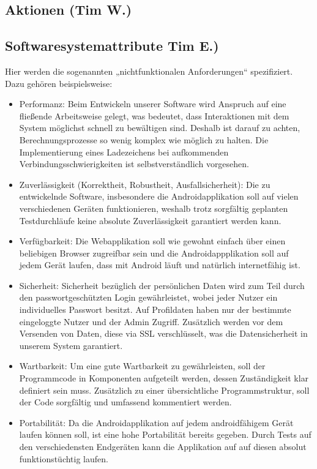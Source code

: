 \documentclass[fontsize=12pt,paper=a4,twoside]{scrartcl}
\begin{document}
\subsection{Aktionen (Tim W.)}
  



\subsection{Softwaresystemattribute Tim E.)}
\label{sec:softwaresystemattribute}

  Hier werden die sogenannten „nichtfunktionalen Anforderungen“ spezifiziert. Dazu gehören beispielsweise: 
\begin{itemize}
	\item Performanz: Beim Entwickeln unserer Software wird Anspruch auf eine fließende Arbeitsweise gelegt, was bedeutet, dass Interaktionen mit dem System möglichst schnell zu bewältigen sind. Deshalb ist darauf zu achten, Berechnungsprozesse so wenig komplex wie möglich zu halten. Die Implementierung eines Ladezeichens bei aufkommenden Verbindungsschwierigkeiten ist selbstverständlich vorgesehen.
	
	\item Zuverlässigkeit (Korrektheit, Robustheit, Ausfallsicherheit): Die zu entwickelnde Software, insbesondere die Androidapplikation soll auf vielen verschiedenen Geräten funktionieren, weshalb trotz sorgfältig geplanten Testdurchläufe keine absolute Zuverlässigkeit garantiert werden kann. 
	
	\item Verfügbarkeit: Die Webapplikation soll wie gewohnt einfach über einen beliebigen Browser zugreifbar sein und die Androidappplikation soll auf jedem Gerät laufen, dass mit Android läuft und natürlich internetfähig ist. 
	
	\item Sicherheit: Sicherheit bezüglich der persönlichen Daten wird zum Teil durch den passwortgeschützten Login gewährleistet, wobei jeder Nutzer ein individuelles Passwort besitzt. Auf Profildaten haben nur der bestimmte eingeloggte Nutzer und der Admin Zugriff. Zusätzlich werden vor dem Versenden von Daten, diese via SSL verschlüsselt, was die Datensicherheit in unserem System garantiert.
	
	\item Wartbarkeit: Um eine gute Wartbarkeit zu gewährleisten, soll der Programmcode in Komponenten aufgeteilt werden, dessen Zuständigkeit klar definiert sein muss. Zusätzlich zu einer übersichtliche Programmstruktur, soll der Code sorgfältig und umfassend kommentiert werden.
	
	\item Portabilität: Da die Androidapplikation auf jedem androidfähigem Gerät laufen können soll, ist eine hohe Portabilität bereits gegeben. Durch Tests auf den verschiedensten Endgeräten kann die Applikation auf auf diesen absolut funktionstüchtig laufen. 
\end{itemize}
\end{document}
